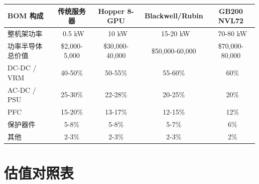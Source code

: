 \begin{exhibitbox}
\centering
\small
\setlength{\tabcolsep}{4pt}
\begin{tabularx}{\textwidth}{X c c c c}
\toprule
\textbf{BOM 构成} & \textbf{传统服务器} & \textbf{Hopper 8-GPU} & \textbf{Blackwell/Rubin} & \textbf{GB200 NVL72} \\
\midrule
整机架功率 & ~0.5 kW & ~10 kW & ~15-20 kW & ~70-80 kW \\
功率半导体总价值 & \$2,000-5,000 & \$30,000-40,000 & \$50,000-60,000 & \$70,000-80,000 \\
\midrule
DC-DC / VRM & 40-50\% & 50-55\% & 55-60\% & ~60\% \\
AC-DC / PSU & 25-30\% & 22-28\% & 20-25\% & ~20\% \\
PFC & 15-20\% & 13-17\% & 12-15\% & ~12\% \\
保护器件 & 5-8\% & 5-8\% & 5-7\% & ~6\% \\
其他 & 2-3\% & 2-3\% & 2-3\% & ~2\% \\
\bottomrule
\end{tabularx}
\end{exhibitbox}

\section{估值对照表}

